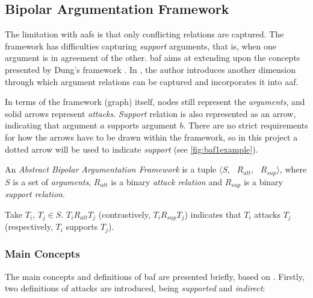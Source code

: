     \subsection{Bipolar Argumentation Framework}
        The limitation with \gls{aaf}s is that only conflicting relations are captured. The framework has difficulties capturing \textit{support} arguments, that is, when one argument is in agreement of the other. \gls{baf} aims at extending upon the concepts presented by Dung's framework \autocite{Dung1995OnTA}. In \autocite{Cayrol2005OnTA}, the author introduces another dimension through which argument relations can be captured and incorporates it into \gls{aaf}. 
        
        In terms of the framework (graph) itself, nodes still represent the \textit{arguments}, and solid arrows represent \textit{attacks}. \textit{Support} relation is also represented as an arrow, indicating that argument $a$ supports argument $b$. There are no strict requirements for how the arrows have to be drawn within the framework, so in this project a dotted arrow will be used to indicate \textit{support} (see \autoref{fig:baf1example}).
        
        \begin{definition}
            An \textit{Abstract Bipolar Argumentation Framework} is a tuple $\langle S, \text{ }R_{att}, \text{ }R_{sup} \rangle$, where $S$ is a set of \textit{arguments},  $R_{att}$ is a binary \textit{attack relation} and $R_{sup}$ is a binary \textit{support relation}.
            \label{definition:definition10}
        \end{definition}
        \begin{exa}
            Take $T_{i}$, $T_{j} \in S$. $T_{i}R_{att}T_{j}$ (contrastively, $T_{i}R_{sup}T_{j}$) indicates that $T_{i}$ attacks $T_{j}$ (respectively, $T_{i}$ supports $T_{j}$).
            \label{exa:example10}
        \end{exa}
        
        
        
        \subsubsection{Main Concepts}
            The main concepts and definitions of \gls{baf} are presented briefly, based on \autocite{Cayrol2005OnTA}. Firstly, two definitions of attacks are introduced, being \textit{supported} and \textit{indirect}:
            
